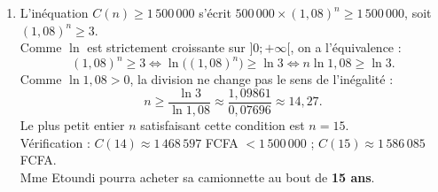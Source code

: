 \documentclass[11pt]{article}
\begin{document}
\begin{exoresolu}
\begin{enumerate}
\begin{enumerate}
Les deux membres sont strictement positifs, on peut appliquer $\ln$ (qui est bijective de $]0;+\infty[$ sur $\mathbb{R}$) :
\[ \ln\big((1,08)^n\big) = \ln 2 \iff n \ln 1,08 = \ln 2 \iff n = \frac{\ln 2}{\ln 1,08}. \]
Numériquement : $\ln 2 \approx 0,69315$, $\ln 1,08 \approx 0,07696$, donc $n \approx \dfrac{0,69315}{0,07696} \approx 9,006$.
\item Comme $n$ représente un nombre d'années entières et que la suite $(C(n))$ est strictement croissante (raison $>1$), le capital a doublé dès que $n \ge 9,006\ldots$ Le plus petit entier convenable est \textbf{$n = 10$}.\\
Vérification : $C(9) = 500\,000 \times 1,08^9 \approx 999\,563$ FCFA $< 1\,000\,000$ ; $C(10) \approx 1\,079\,462$ FCFA $> 1\,000\,000$.\\
\textbf{Conclusion :} Mme Etoundi verra son capital doubler au bout de \textbf{10 ans}.
\end{enumerate}
\item L'inéquation $C(n) \geq 1\,500\,000$ s'écrit $500\,000 \times (1,08)^n \geq 1\,500\,000$, soit $(1,08)^n \geq 3$.\\
Comme $\ln$ est strictement croissante sur $]0;+\infty[$, on a l'équivalence :
\[ (1,08)^n \geq 3 \iff \ln\big((1,08)^n\big) \geq \ln 3 \iff n \ln 1,08 \geq \ln 3. \]
Comme $\ln 1,08 > 0$, la division ne change pas le sens de l'inégalité :
\[ n \geq \frac{\ln 3}{\ln 1,08} \approx \frac{1,09861}{0,07696} \approx 14,27. \]
Le plus petit entier $n$ satisfaisant cette condition est \textbf{$n = 15$}.\\
Vérification : $C(14) \approx 1\,468\,597$ FCFA $< 1\,500\,000$ ; $C(15) \approx 1\,586\,085$ FCFA.\\
Mme Etoundi pourra acheter sa camionnette au bout de \textbf{15 ans}.
\end{enumerate}


\end{exoresolu}
\end{document}
